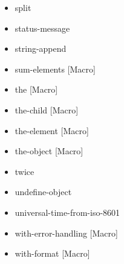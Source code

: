 \documentclass [11pt]{book}
\begin{document}
\begin{itemize}
\item {}split





\item {}status-message





\item {}string-append





\item {}sum-elements [Macro]





\item {}the [Macro]





\item {}the-child [Macro]





\item {}the-element [Macro]





\item {}the-object [Macro]





\item {}twice





\item {}undefine-object





\item {}universal-time-from-iso-8601





\item {}with-error-handling [Macro]





\item {}with-format [Macro]






\end{itemize}
\end{document}
